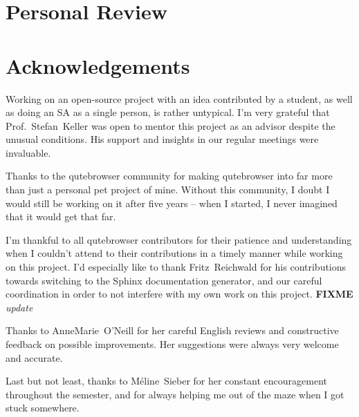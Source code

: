\documentclass[a4paper,parskip=full]{scrreprt}
\newcommand{\fixme}[1]{\textbf{FIXME} \emph{#1}}
\begin{document}
\section{Personal Review}

\section{Acknowledgements}
Working on an open-source project with an idea contributed by a student, as well
as doing an SA as a single person, is rather untypical. I'm very grateful that
Prof.~Stefan~Keller was open to mentor this project as an advisor despite the
unusual conditions. His support and insights in our regular meetings were
invaluable.

Thanks to the qutebrowser community for making qutebrowser into far more than
just a personal pet project of mine. Without this community, I doubt I would
still be working on it after five years -- when I started, I never imagined that
it would get that far.

I'm thankful to all qutebrowser contributors for their patience and
understanding when I couldn't attend to their contributions in a timely manner
while working on this project. I'd especially like to thank Fritz~Reichwald for
his contributions towards switching to the Sphinx documentation generator, and
our careful coordination in order to not interfere with my own work on this
project. \fixme{update}

Thanks to AnneMarie~O'Neill for her careful English reviews and constructive
feedback on possible improvements. Her suggestions were always very welcome and
accurate.

Last but not least, thanks to Méline~Sieber for her constant encouragement
throughout the semester, and for always helping me out of the maze when I got
stuck somewhere.
\end{document}
